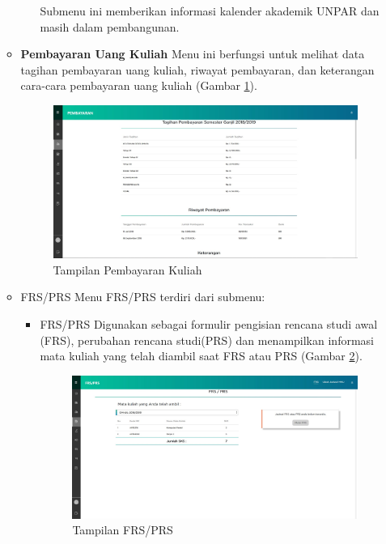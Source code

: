 \begin{enumerate}
\begin{itemize}
\begin{itemize}
			Submenu ini memberikan informasi kalender akademik UNPAR dan masih dalam pembangunan.
		\end{itemize}
		\item \textbf{Pembayaran Uang Kuliah}
		Menu ini berfungsi untuk melihat data tagihan pembayaran uang kuliah, riwayat pembayaran, dan keterangan cara-cara pembayaran uang kuliah (Gambar \ref{fig:studentportal_pembayaran_kuliah}).
		\begin{figure}[H]
			\centering
			\includegraphics[scale=0.3]{Gambar/studentportal_pembayaran_kuliah}
			\caption{Tampilan Pembayaran Kuliah}
			\label{fig:studentportal_pembayaran_kuliah}
		\end{figure}
		\item FRS/PRS
		Menu FRS/PRS terdiri dari submenu:
		\begin{itemize}
			\item FRS/PRS
			Digunakan sebagai formulir pengisian rencana studi awal (FRS), perubahan rencana studi(PRS) dan menampilkan informasi mata kuliah yang telah diambil saat FRS atau PRS (Gambar \ref{fig:studentportal_frs_prs}).
			\begin{figure}[H]
				\centering
				\includegraphics[scale=0.3]{Gambar/studentportal_frs_prs}
				\caption{Tampilan FRS/PRS}
				\label{fig:studentportal_frs_prs}

\end{figure}
\end{itemize}
\end{itemize}
\end{enumerate}
